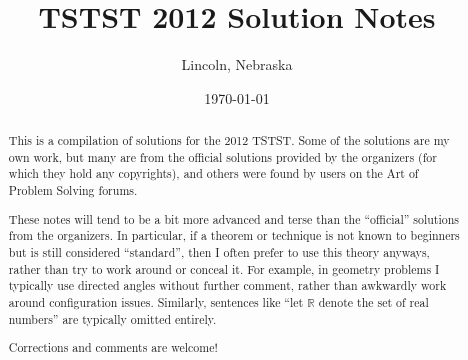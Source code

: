 \documentclass[11pt]{scrartcl}
\begin{document}
\title{TSTST 2012 Solution Notes}
\subtitle{Lincoln, Nebraska}
\date{\today}

\maketitle
\begin{abstract}
This is a compilation of solutions
for the 2012 TSTST.
Some of the solutions are my own work,
but many are from the official solutions provided by the organizers
(for which they hold any copyrights),
and others were found by users on the Art of Problem Solving forums.

These notes will tend to be a bit more advanced and terse than the ``official''
solutions from the organizers.
In particular, if a theorem or technique is not known to beginners
but is still considered ``standard'', then I often prefer to
use this theory anyways, rather than try to work around or conceal it.
For example, in geometry problems I typically use directed angles
without further comment, rather than awkwardly work around configuration issues.
Similarly, sentences like ``let $\mathbb{R}$ denote the set of real numbers''
are typically omitted entirely.

Corrections and comments are welcome!
\end{abstract}
\tableofcontents
\newpage

\addtocounter{section}{-1}
\end{document}

